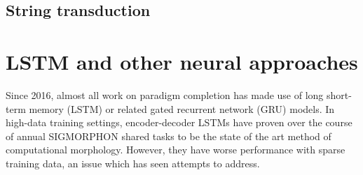 \subsection{String transduction}

\section{LSTM and other neural approaches}

Since 2016, almost all work on paradigm completion has made use of long short-term memory (LSTM) or related gated recurrent network (GRU) models. \parencite{Faruqui2015} \parencite{Cotterell2016} \parencite{Cotterell2017} \parencite{Cotterell2018b} \parencite{McCarthy2019} In high-data training settings, encoder-decoder LSTMs have proven over the course of annual SIGMORPHON shared tasks to be the state of the art method of computational morphology. However, they have worse performance with sparse training data, an issue which has seen attempts to address.





